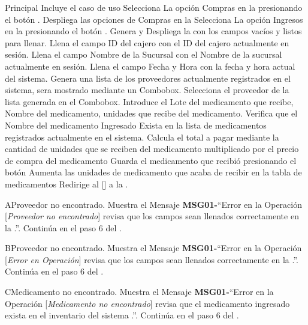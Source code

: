 	\begin{UCtrayectoria}{Principal}
		\UCpaso Incluye el caso de uso  
		\UCpaso[\UCactor] Selecciona La opción Compras en la  presionando el botón .
		\UCpaso Despliega las opciones de Compras en la 
		\UCpaso [\UCactor] Selecciona La opción Ingresos en la  presionando el botón .
		\UCpaso Genera y Despliega la  con los campos vacíos y listos para llenar.
		\UCpaso Llena el campo ID del cajero con el ID del cajero actualmente en sesión.
		\UCpaso Llena el campo Nombre de la Sucursal con el Nombre de la sucursal actualmente en sesión.
		\UCpaso Llena el campo Fecha y Hora con la fecha y hora actual del sistema.
		\UCpaso Genera una lista de los proveedores actualmente registrados en el sistema, sera mostrado mediante un Combobox.
		\UCpaso[\UCactor] Selecciona el proveedor de la lista generada en el Combobox. 
		\UCpaso[\UCactor] Introduce el Lote del medicamento que recibe, Nombre del medicamento, unidades que recibe del medicamento. 
		\UCpaso Verifica que el Nombre del medicamento Ingresado Exista en la lista de medicamentos registrados actualmente en el sistema. 
		\UCpaso Calcula el total a pagar mediante la cantidad de unidades que se reciben del medicamento multiplicado por el precio de compra del medicamento
		\UCpaso[\UCactor] Guarda el medicamento que recibió presionando el botón 
		\UCpaso Aumenta las unidades de medicamento que acaba de recibir en la tabla de medicamentos
		\UCpaso Redirige al [\UCactor] a la  .
	\end{UCtrayectoria}


\begin{UCtrayectoriaA}{A}{Proveedor no encontrado.}
			\UCpaso Muestra el Mensaje {\bf MSG01-}``Error en la Operación [{\em Proveedor no encontrado}] revisa que los campos sean llenados correctamente en la .''.
			\UCpaso Continúa en el paso 6 del .
		\end{UCtrayectoriaA}
\begin{UCtrayectoriaA}{B}{Proveedor no encontrado.}
			\UCpaso Muestra el Mensaje {\bf MSG01-}``Error en la Operación [{\em Error en Operación}] revisa que los campos sean llenados correctamente en la .''.
			\UCpaso Continúa en el paso 6 del .
		\end{UCtrayectoriaA}
\begin{UCtrayectoriaA}{C}{Medicamento no encontrado.}
			\UCpaso Muestra el Mensaje {\bf MSG01-}``Error en la Operación [{\em Medicamento no encontrado}] revisa que el medicamento ingresado exista en el inventario del sistema .''.
			\UCpaso Continúa en el paso 6 del .
		\end{UCtrayectoriaA}

